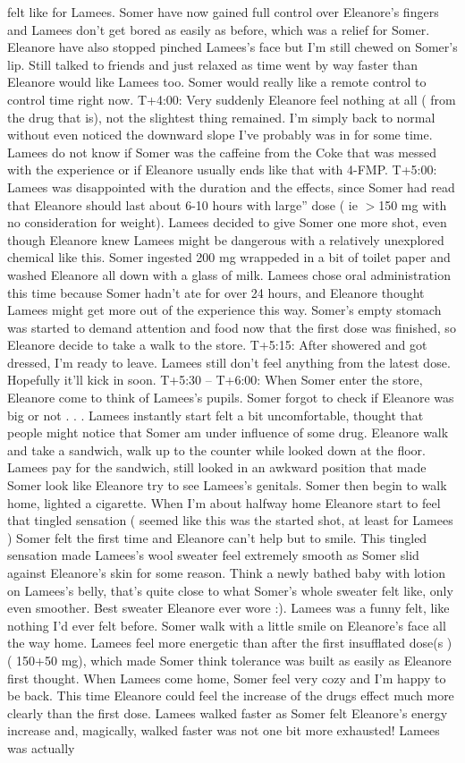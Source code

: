 \documentclass[12pt]{book}
\begin{document}
felt like for Lamees. Somer have now gained full control over Eleanore's fingers and Lamees don't get bored as easily as before, which was a relief for Somer. Eleanore have also stopped pinched Lamees's face but I'm still chewed on Somer's lip. Still talked to friends and just relaxed as time went by way faster than Eleanore would like Lamees too. Somer would really like a remote control to control time right now. T+4:00: Very suddenly Eleanore feel nothing at all ( from the drug that is), not the slightest thing remained. I'm simply back to normal without even noticed the downward slope I've probably was in for some time. Lamees do not know if Somer was the caffeine from the Coke that was messed with the experience or if Eleanore usually ends like that with 4-FMP. T+5:00: Lamees was disappointed with the duration and the effects, since Somer had read that Eleanore should last about 6-10 hours with large'' dose ( ie $>$150 mg with no consideration for weight). Lamees decided to give Somer one more shot, even though Eleanore knew Lamees might be dangerous with a relatively unexplored chemical like this. Somer ingested 200 mg wrappeded in a bit of toilet paper and washed Eleanore all down with a glass of milk. Lamees chose oral administration this time because Somer hadn't ate for over 24 hours, and Eleanore thought Lamees might get more out of the experience this way. Somer's empty stomach was started to demand attention and food now that the first dose was finished, so Eleanore decide to take a walk to the store. T+5:15: After showered and got dressed, I'm ready to leave. Lamees still don't feel anything from the latest dose. Hopefully it'll kick in soon. T+5:30 -- T+6:00: When Somer enter the store, Eleanore come to think of Lamees's pupils. Somer forgot to check if Eleanore was big or not . . .  Lamees instantly start felt a bit uncomfortable, thought that people might notice that Somer am under influence of some drug. Eleanore walk and take a sandwich, walk up to the counter while looked down at the floor. Lamees pay for the sandwich, still looked in an awkward position that made Somer look like Eleanore try to see Lamees's genitals. Somer then begin to walk home, lighted a cigarette. When I'm about halfway home Eleanore start to feel that tingled sensation ( seemed like this was the started shot, at least for Lamees ) Somer felt the first time and Eleanore can't help but to smile. This tingled sensation made Lamees's wool sweater feel extremely smooth as Somer slid against Eleanore's skin for some reason. Think a newly bathed baby with lotion on Lamees's belly, that's quite close to what Somer's whole sweater felt like, only even smoother. Best sweater Eleanore ever wore :). Lamees was a funny felt, like nothing I'd ever felt before. Somer walk with a little smile on Eleanore's face all the way home. Lamees feel more energetic than after the first insufflated dose(s ) ( 150+50 mg), which made Somer think tolerance was built as easily as Eleanore first thought. When Lamees come home, Somer feel very cozy and I'm happy to be back. This time Eleanore could feel the increase of the drugs effect much more clearly than the first dose. Lamees walked faster as Somer felt Eleanore's energy increase and, magically, walked faster was not one bit more exhausted! Lamees was actually 
\end{document}
